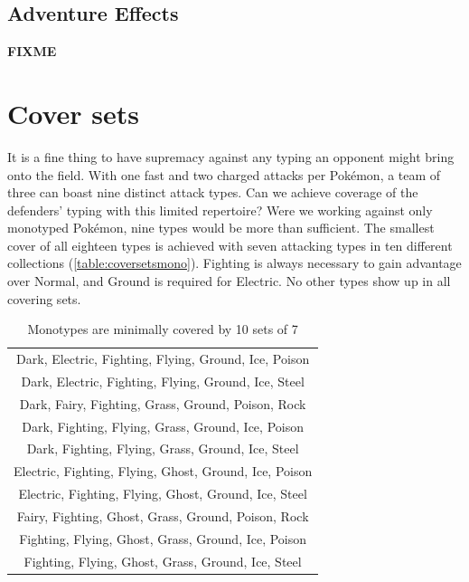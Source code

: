 \subsection{Adventure Effects}
\label{sec:effects}
\textbf{FIXME}

\section{Cover sets}
\label{sec:coversets}
It is a fine thing to have supremacy against any typing an opponent might bring onto the field.
With one fast and two charged attacks per Pokémon, a team of three can boast nine distinct attack types.
Can we achieve coverage of the defenders' typing with this limited repertoire?
Were we working against only monotyped Pokémon, nine types would be more than sufficient.
The smallest cover of all eighteen types is achieved with seven attacking types in
  ten different collections (\autoref{table:coversetsmono}).
Fighting is always necessary to gain advantage over Normal, and Ground is required for Electric.
No other types show up in all covering sets.
\begin{table}[ht]
\begin{centering}
  \begin{tabular}{c}
 Dark, Electric, Fighting, Flying, Ground, Ice, Poison\\
 Dark, Electric, Fighting, Flying, Ground, Ice, Steel\\
 Dark, Fairy, Fighting, Grass, Ground, Poison, Rock\\
 Dark, Fighting, Flying, Grass, Ground, Ice, Poison\\
 Dark, Fighting, Flying, Grass, Ground, Ice, Steel\\
 Electric, Fighting, Flying, Ghost, Ground, Ice, Poison\\
 Electric, Fighting, Flying, Ghost, Ground, Ice, Steel\\
 Fairy, Fighting, Ghost, Grass, Ground, Poison, Rock\\
 Fighting, Flying, Ghost, Grass, Ground, Ice, Poison\\
 Fighting, Flying, Ghost, Grass, Ground, Ice, Steel\\
  \end{tabular}
  \caption{Monotypes are minimally covered by 10 sets of 7}
  \label{table:coversetsmono}
\end{centering}
\end{table}

